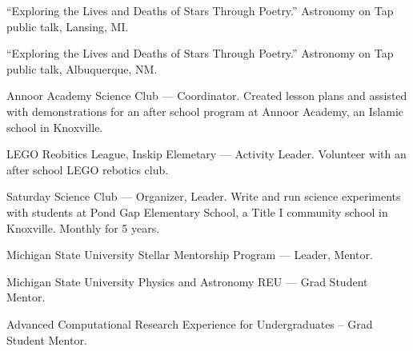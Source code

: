 \documentclass[11pt]{vitae}
\begin{document}
\begin{genericlist}

\item ``Exploring the Lives and Deaths of Stars Through Poetry.'' Astronomy on Tap public talk, Lansing, MI.

\item ``Exploring the Lives and Deaths of Stars Through Poetry.'' Astronomy on Tap public talk, Albuquerque, NM.

\item Annoor Academy Science Club --- Coordinator. Created lesson plans and assisted with demonstrations for an after school program at Annoor Academy, an Islamic school in Knoxville.

\item LEGO Reobitics League, Inskip Elemetary --- Activity Leader. Volunteer with an after school LEGO rebotics club.

\item Saturday Science Club --- Organizer, Leader. Write and run science experiments with students at Pond Gap Elementary School, a Title I community school in Knoxville. Monthly for 5 years.

\end{genericlist}

\begin{genericlist}
\item Michigan State University Stellar Mentorship Program --- Leader, Mentor.
\item Michigan State University Physics and Astronomy REU --- Grad Student Mentor.
\item Advanced Computational Research Experience for Undergraduates -- Grad Student Mentor.
\end{genericlist}
\end{document}
